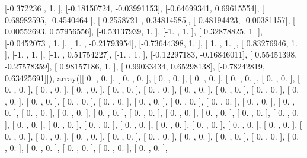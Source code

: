 \documentclass{article}
\begin{document}
       [-0.372236  ,  1.        ],
       [-0.18150724, -0.03991153],
       [-0.64699341,  0.69615554],
       [ 0.68982595, -0.4540464 ],
       [ 0.2558721 ,  0.34814585],
       [-0.48194423, -0.00381157],
       [ 0.00552693,  0.57956556],
       [-0.53137939,  1.        ],
       [-1.        ,  1.        ],
       [ 0.32878825,  1.        ],
       [-0.0452073 ,  1.        ],
       [ 1.        , -0.21793954],
       [-0.73644398,  1.        ],
       [ 1.        ,  1.        ],
       [ 0.83276946,  1.        ],
       [-1.        ,  1.        ],
       [-1.        ,  0.51754227],
       [-1.        ,  1.        ],
       [-0.12297183, -0.16846011],
       [ 0.55451398, -0.27578359],
       [ 0.98157186,  1.        ],
       [ 0.99033434,  0.65298138],
       [-0.78242819,  0.63425691]]), array([[ 0.        ,  0.        ],
       [ 0.        ,  0.        ],
       [ 0.        ,  0.        ],
       [ 0.        ,  0.        ],
       [ 0.        ,  0.        ],
       [ 0.        ,  0.        ],
       [ 0.        ,  0.        ],
       [ 0.        ,  0.        ],
       [ 0.        ,  0.        ],
       [ 0.        ,  0.        ],
       [ 0.        ,  0.        ],
       [ 0.        ,  0.        ],
       [ 0.        ,  0.        ],
       [ 0.        ,  0.        ],
       [ 0.        ,  0.        ],
       [ 0.        ,  0.        ],
       [ 0.        ,  0.        ],
       [ 0.        ,  0.        ],
       [ 0.        ,  0.        ],
       [ 0.        ,  0.        ],
       [ 0.        ,  0.        ],
       [ 0.        ,  0.        ],
       [ 0.        ,  0.        ],
       [ 0.        ,  0.        ],
       [ 0.        ,  0.        ],
       [ 0.        ,  0.        ],
       [ 0.        ,  0.        ],
       [ 0.        ,  0.        ],
       [ 0.        ,  0.        ],
       [ 0.        ,  0.        ],
       [ 0.        ,  0.        ],
       [ 0.        ,  0.        ],
       [ 0.        ,  0.        ],
       [ 0.        ,  0.        ],
       [ 0.        ,  0.        ],
       [ 0.        ,  0.        ],
       [ 0.        ,  0.        ],
       [ 0.        ,  0.        ],
       [ 0.        ,  0.        ],
       [ 0.        ,  0.        ],
       [ 0.        ,  0.        ],
       [ 0.        ,  0.        ],
       [ 0.        ,  0.        ],
       [ 0.        ,  0.        ],
       [ 0.        ,  0.        ],
       [ 0.        ,  0.        ],
       [ 0.        ,  0.        ],
       [ 0.        ,  0.        ],
       [ 0.        ,  0.        ],
       [ 0.        ,  0.        ],
       [ 0.        ,  0.        ],
       [ 0.        ,  0.        ],
\end{document}
